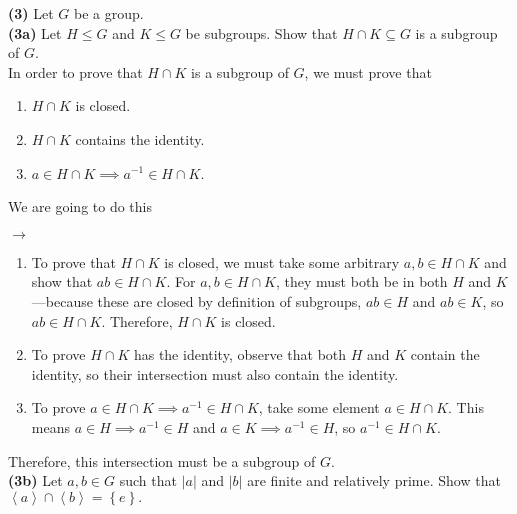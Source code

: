 \documentclass[12pt,letterpaper]{article}
\begin{document}
\textbf{(3)} Let \(G\) be a group.\\

\textbf{(3a)} Let \(H \leq G\) and \(K \leq G\) be subgroups. Show that \(H \cap K \subseteq G\) is a subgroup of \(G\). \\

In order to prove that \(H \cap K\) is a subgroup of \(G\), we must prove that 

\begin{enumerate}
	\item \(H \cap K\) is closed.
	\item \(H \cap K\) contains the identity.
	\item \(a \in H \cap K \implies a^{-1} \in H \cap K\). 
\end{enumerate}

We are going to do this \begin{Huge}\(\longrightarrow\)\end{Huge}

\begin{enumerate}
	\item To prove that \(H \cap K\) is closed, we must take some arbitrary \(a,b\in H \cap K\) and show that \(ab \in H \cap K\). For \(a,b \in H \cap K\), they must both be in both \(H\) and \(K\)---because these are closed by definition of subgroups, \(ab \in H\) and \(ab \in K\), so \(ab \in H \cap K\). Therefore, \(H \cap K\) is closed.
	\item To prove \(H \cap K\) has the identity, observe that both \(H\) and \(K\) contain the identity, so their intersection must also contain the identity.
	\item To prove \(a \in H \cap K \implies a^{-1} \in H \cap K\), take some element \(a \in H \cap K\). This means \(a \in H \implies a^{-1} \in H\) and \(a \in K \implies a^{-1} \in H\), so \(a^{-1} \in H \cap K\).
\end{enumerate}

Therefore, this intersection must be a subgroup of \(G\). \\

\textbf{(3b)} Let \(a,b \in G\) such that \(|a|\) and \(|b|\) are finite and relatively prime. Show that \(\left<a\right> \cap \left<b\right> = \left\{e\right\}.\) \\
\end{document}
